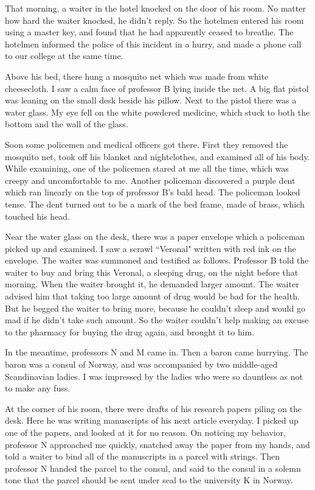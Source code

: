 \documentclass[11pt,a4j,twocolumn]{jarticle}
\begin{document}
That morning, a waiter in the hotel knocked on the door of his room.
No matter how hard the waiter knocked, he didn't reply.
So the hotelmen entered his room using a master key,
and found that he had apparently ceased to breathe.
The hotelmen informed the police of this incident in a hurry,
and made a phone call to our college at the same time.

Above his bed, there hung a mosquito net which was made from white cheesecloth.
I saw a calm face of professor B lying inside the net.
A big flat pistol was leaning on the small desk beside his pillow.
Next to the pistol there was a water glass. 
My eye fell on the white powdered medicine,
which stuck to both the bottom and the wall of the glass.

Soon some policemen and medical officers got there.
First they removed the mosquito net, 
took off his blanket and nightclothes, and examined all of his body.
While examining, one of the policemen stared at me all the time,
which was creepy and uncomfortable to me.
Another policeman discovered a purple dent which ran
linearly on the top of professor B's bald head.
The policeman looked tense.
The dent turned out to be a mark of the bed frame, made of brass, which touched his head.

Near the water glass on the desk, there was a paper envelope
which a policeman picked up and examined.
I saw a scrawl ``Veronal" written with red ink on the envelope.
The waiter was summoned and testified as follows.
Professor B told the waiter to buy and bring this Veronal, 
a sleeping drug, on the night before that morning.
When the waiter brought it, he demanded larger amount.
The waiter advised him that taking too large amount of drug 
would be bad for the health. But he begged the waiter to bring more,
because he couldn't sleep and would go mad if he didn't take such amount.
So the waiter couldn't help making an excuse to the pharmacy
for buying the drug again, and brought it to him.

In the meantime, professors N and M came in.
Then a baron came hurrying. The baron was a consul of Norway, 
and was accompanied by two middle-aged Scandinavian ladies.
I was impressed by the ladies who were so dauntless 
as not to make any fuss.

At the corner of his room, there were drafts of his research papers
piling on the desk. Here he was writing manuscripts
of his next article everyday. I picked up one of the papers,
and looked at it for no reason. On noticing my behavior, 
professor N approached me quickly,
snatched away the paper from my hands,
and told a waiter to bind all of the manuscripts in a parcel with strings.
Then professor N handed the parcel to the consul,
and said to the consul in a solemn tone that
the parcel should be sent under seal to the university K in Norway.
\end{document}
